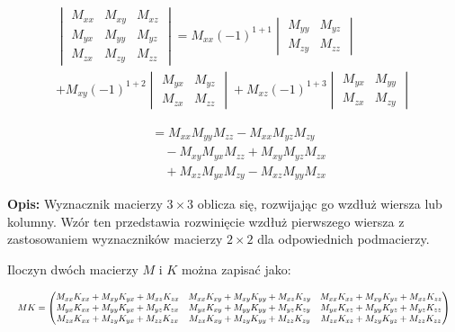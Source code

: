 \begin{multline*}
    \begin{vmatrix}
    M_{xx} & M_{xy} & M_{xz} \\
    M_{yx} & M_{yy} & M_{yz} \\
    M_{zx} & M_{zy} & M_{zz}
    \end{vmatrix}
    =
    M_{xx}(-1)^{1+1}
    \begin{vmatrix}
    M_{yy} & M_{yz} \\
    M_{zy} & M_{zz}
    \end{vmatrix} \\
    + M_{xy}(-1)^{1+2}
    \begin{vmatrix}
    M_{yx} & M_{yz} \\
    M_{zx} & M_{zz}
    \end{vmatrix}
    + M_{xz}(-1)^{1+3}
    \begin{vmatrix}
    M_{yx} & M_{yy} \\
    M_{zx} & M_{zy}
    \end{vmatrix}
    \end{multline*}
    
    \begin{align*}
    &= M_{xx}M_{yy}M_{zz} - M_{xx}M_{yz}M_{zy} \\
    &\quad - M_{xy}M_{yx}M_{zz} + M_{xy}M_{yz}M_{zx} \\
    &\quad + M_{xz}M_{yx}M_{zy} - M_{xz}M_{yy}M_{zx}
    \end{align*}

\vspace{1em}
\noindent
\textbf{Opis:} Wyznacznik macierzy \( 3 \times 3 \) oblicza się, rozwijając go wzdłuż wiersza lub kolumny. Wzór ten przedstawia rozwinięcie wzdłuż pierwszego wiersza z zastosowaniem wyznaczników macierzy \( 2 \times 2 \) dla odpowiednich podmacierzy.




\vspace{1em}
\noindent
Iloczyn dwóch macierzy \( M \) i \( K \) można zapisać jako:

\[
\resizebox{\textwidth}{!}{$
MK =
\begin{pmatrix}
M_{xx}K_{xx} + M_{xy}K_{yx} + M_{xz}K_{zx} & M_{xx}K_{xy} + M_{xy}K_{yy} + M_{xz}K_{zy} & M_{xx}K_{xz} + M_{xy}K_{yz} + M_{xz}K_{zz} \\
M_{yx}K_{xx} + M_{yy}K_{yx} + M_{yz}K_{zx} & M_{yx}K_{xy} + M_{yy}K_{yy} + M_{yz}K_{zy} & M_{yx}K_{xz} + M_{yy}K_{yz} + M_{yz}K_{zz} \\
M_{zx}K_{xx} + M_{zy}K_{yx} + M_{zz}K_{zx} & M_{zx}K_{xy} + M_{zy}K_{yy} + M_{zz}K_{zy} & M_{zx}K_{xz} + M_{zy}K_{yz} + M_{zz}K_{zz}
\end{pmatrix}
$}
\]


